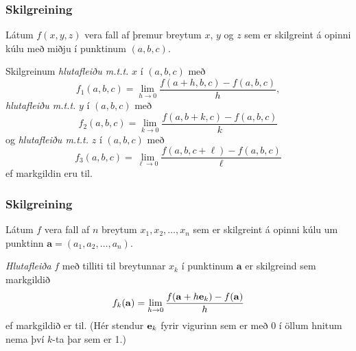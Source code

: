 \subsubsection{Skilgreining }
  
Látum $f(x,y,z)$ vera fall af þremur breytum $x$, $y$ og $z$ sem er skilgreint á opinni kúlu með miðju í punktinum $(a, b,c)$. 

\medskip

Skilgreinum \emph{hlutafleiðu m.t.t.} $x$ í $(a,b,c)$ með
$$f_1(a,b,c)=\lim_{h\rightarrow 0}\frac{f(a+h,b,c)-f(a,b,c)}{h},$$
 \emph{hlutafleiðu m.t.t.} $y$ í $(a,b,c)$ með
$$f_2(a,b,c)=\lim_{k\rightarrow 0}\frac{f(a,b+k,c)-f(a,b,c)}{k}$$ og  \emph{hlutafleiðu m.t.t.} $z$ í $(a,b,c)$ með
$$f_3(a,b,c)=\lim_{\ell\rightarrow 0}\frac{f(a,b,c+\ell)-f(a,b,c)}{\ell}$$
ef markgildin eru til.
 


\subsubsection{Skilgreining }
Látum $f$ vera fall af
$n$ breytum $x_1,x_2,\ldots,x_n$ sem er skilgreint á opinni kúlu um punktinn $\mathbf{a}=(a_1, a_2, \ldots, a_n).$ 

\medskip	
{\em Hlutafleiða} $f$ með
tilliti til breytunnar $x_k$ í punktinum $\mathbf{a}$ er skilgreind sem markgildið 
$$f_k(\mathbf{a})=\lim_{h\rightarrow 0}\frac{f(\mathbf{a}+h\mbox{${\bf e}$}_k)-f(\mathbf{a})}{h}$$
ef markgildið er til.  (Hér stendur $\mbox{${\bf e}$}_k$ fyrir vigurinn sem er með
0 í öllum hnitum nema því $k$-ta þar sem er 1.)








\subsection{}



